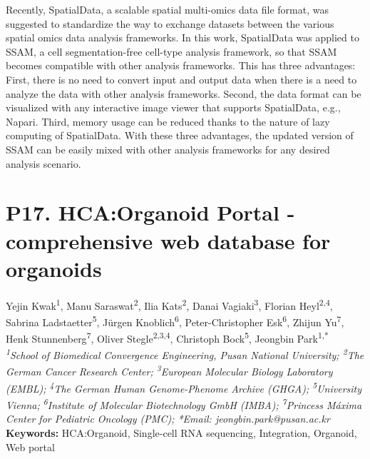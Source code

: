 \noindent
Recently, SpatialData, a scalable spatial multi-omics data file format, was suggested to standardize the way to exchange datasets between the various spatial omics data analysis frameworks. In this work, SpatialData was applied to SSAM, a cell segmentation-free cell-type analysis framework, so that SSAM becomes compatible with other analysis frameworks. This has three advantages: First, there is no need to convert input and output data when there is a need to analyze the data with other analysis frameworks. Second, the data format can be visualized with any interactive image viewer that supports SpatialData, e.g., Napari. Third, memory usage can be reduced thanks to the nature of lazy computing of SpatialData. With these three advantages, the updated version of SSAM can be easily mixed with other analysis frameworks for any desired analysis scenario.
\newpage

\section*{P17. HCA:Organoid Portal - comprehensive web database for organoids}

\begin{center}
Yejin Kwak\textsuperscript{1}, Manu Saraswat\textsuperscript{2}, Ilia Kats\textsuperscript{2}, Danai Vagiaki\textsuperscript{3}, Florian Heyl\textsuperscript{2,4}, Sabrina Ladstaetter\textsuperscript{5}, Jürgen Knoblich\textsuperscript{6}, Peter-Christopher Esk\textsuperscript{6}, Zhijun Yu\textsuperscript{7}, Henk Stunnenberg\textsuperscript{7}, Oliver Stegle\textsuperscript{2,3,4}, Christoph Bock\textsuperscript{5}, Jeongbin Park\textsuperscript{1,*} \\
\vspace{0.2cm}
\textit{\textsuperscript{1}School of Biomedical Convergence Engineering, Pusan National University; \textsuperscript{2}The German Cancer Research Center; \textsuperscript{3}European Molecular Biology Laboratory (EMBL); \textsuperscript{4}The German Human Genome-Phenome Archive (GHGA); \textsuperscript{5}University Vienna; \textsuperscript{6}Institute of Molecular Biotechnology GmbH (IMBA); \textsuperscript{7}Princess Máxima Center for Pediatric Oncology (PMC); *Email: jeongbin.park@pusan.ac.kr} \\
\vspace{0.2cm}
\textbf{Keywords:} HCA:Organoid, Single-cell RNA sequencing, Integration, Organoid, Web portal
\end{center}

